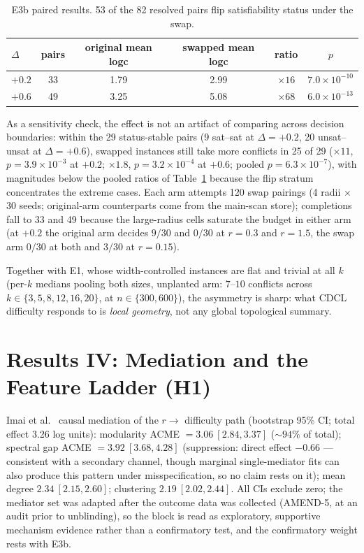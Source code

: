 \documentclass[11pt]{article}
\begin{document}
\begin{table}[h]
\centering
\begin{tabular}{lccccc}
\toprule
$\Delta$ & pairs & original mean logc & swapped mean logc & ratio & $p$\\
\midrule
$+0.2$ & 33 & 1.79 & 2.99 & $\times 16$ & $7.0\times10^{-10}$\\
$+0.6$ & 49 & 3.25 & 5.08 & $\times 68$ & $6.0\times10^{-13}$\\
\bottomrule
\end{tabular}
\caption{E3b paired results. 53 of the 82 resolved pairs flip satisfiability
status under the swap.}
\label{tab:e3b}
\end{table}

As a sensitivity check, the effect is not an artifact of comparing across
decision boundaries: within the 29 status-stable pairs (9 sat--sat at
$\Delta{=}{+}0.2$, 20 unsat--unsat at $\Delta{=}{+}0.6$), swapped instances
still take more conflicts in 25 of 29 ($\times 11$, $p=3.9\times10^{-3}$ at
$+0.2$; $\times 1.8$, $p=3.2\times10^{-4}$ at $+0.6$; pooled
$p=6.3\times10^{-7}$), with magnitudes below the pooled ratios of
Table~\ref{tab:e3b} because the flip stratum concentrates the extreme cases.
Each arm attempts 120 swap pairings (4 radii $\times$ 30 seeds;
original-arm counterparts come from the main-scan store); completions fall
to 33 and 49 because the large-radius cells saturate the budget in either
arm (at $+0.2$ the original arm decides $9/30$ and $0/30$ at $r{=}0.3$ and
$r{=}1.5$, the swap arm $0/30$ at both and $3/30$ at $r{=}0.15$).

Together with E1, whose width-controlled instances are flat and trivial at all
$k$ (per-$k$ medians pooling both sizes, unplanted arm: $7$--$10$ conflicts
across $k\in\{3,5,8,12,16,20\}$, at $n\in
\{300,600\}$), the asymmetry is sharp: what CDCL difficulty responds to
is \emph{local geometry}, not any global topological summary.

\section{Results IV: Mediation and the Feature Ladder (H1)}
\label{sec:mediation}

Imai et al.~\cite{imai2011} causal mediation of the $r \to$ difficulty path (bootstrap
95\% CI; total effect 3.26 log units): modularity ACME $= 3.06\ [2.84, 3.37]$
(${\sim}94\%$ of total); spectral gap ACME $= 3.92\ [3.68, 4.28]$
(suppression: direct effect $-0.66$ --- consistent with a secondary channel,
though marginal single-mediator fits can also produce this pattern under
misspecification, so no claim rests on it); mean degree $2.34\ [2.15, 2.60]$; clustering
$2.19\ [2.02, 2.44]$. All CIs exclude zero; the mediator set was adapted
after the outcome data was collected (AMEND-5, at an audit prior to
unblinding), so the block is read as
exploratory, supportive mechanism evidence rather than a confirmatory test,
and the confirmatory weight rests with E3b.
\end{document}
